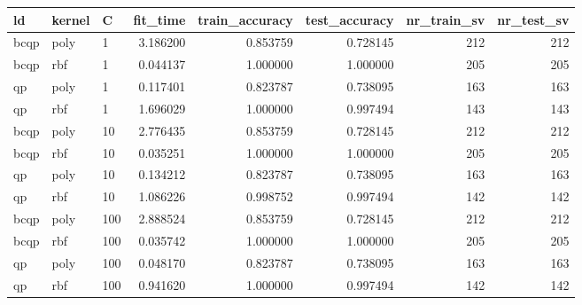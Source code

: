 \begin{tabular}{lllrrrrr}
\toprule
  ld & kernel &   C &  fit\_time &  train\_accuracy &  test\_accuracy &  nr\_train\_sv &  nr\_test\_sv \\
\midrule
bcqp &   poly &   1 &  3.186200 &        0.853759 &       0.728145 &          212 &         212 \\
bcqp &    rbf &   1 &  0.044137 &        1.000000 &       1.000000 &          205 &         205 \\
  qp &   poly &   1 &  0.117401 &        0.823787 &       0.738095 &          163 &         163 \\
  qp &    rbf &   1 &  1.696029 &        1.000000 &       0.997494 &          143 &         143 \\
bcqp &   poly &  10 &  2.776435 &        0.853759 &       0.728145 &          212 &         212 \\
bcqp &    rbf &  10 &  0.035251 &        1.000000 &       1.000000 &          205 &         205 \\
  qp &   poly &  10 &  0.134212 &        0.823787 &       0.738095 &          163 &         163 \\
  qp &    rbf &  10 &  1.086226 &        0.998752 &       0.997494 &          142 &         142 \\
bcqp &   poly & 100 &  2.888524 &        0.853759 &       0.728145 &          212 &         212 \\
bcqp &    rbf & 100 &  0.035742 &        1.000000 &       1.000000 &          205 &         205 \\
  qp &   poly & 100 &  0.048170 &        0.823787 &       0.738095 &          163 &         163 \\
  qp &    rbf & 100 &  0.941620 &        1.000000 &       0.997494 &          142 &         142 \\
\bottomrule
\end{tabular}
